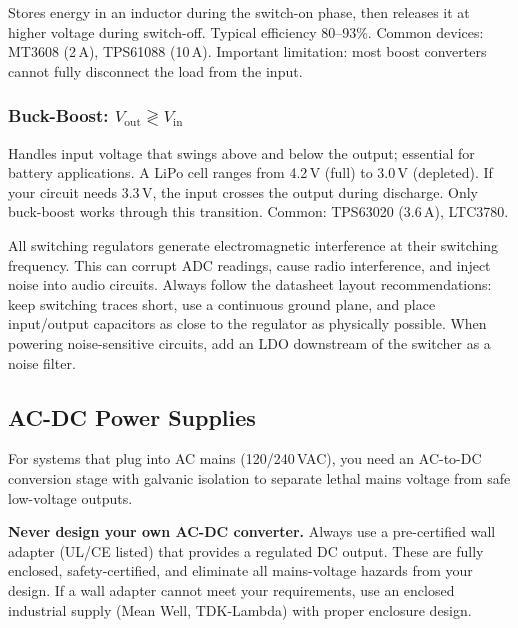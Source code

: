 Stores energy in an inductor during the switch-on phase, then releases it at higher voltage during switch-off. Typical efficiency 80--93\%. Common devices: MT3608 (2\,A), TPS61088 (10\,A). Important limitation: most boost converters cannot fully disconnect the load from the input.

\subsubsection{Buck-Boost: $V_{\text{out}} \gtrless V_{\text{in}}$}

Handles input voltage that swings above and below the output; essential for battery applications. A LiPo cell ranges from 4.2\,V (full) to 3.0\,V (depleted). If your circuit needs 3.3\,V, the input crosses the output during discharge. Only buck-boost works through this transition. Common: TPS63020 (3.6\,A), LTC3780.

\begin{warningbox}
All switching regulators generate electromagnetic interference at their switching frequency. This can corrupt ADC readings, cause radio interference, and inject noise into audio circuits. Always follow the datasheet layout recommendations: keep switching traces short, use a continuous ground plane, and place input/output capacitors as close to the regulator as physically possible. When powering noise-sensitive circuits, add an LDO downstream of the switcher as a noise filter.
\end{warningbox}

\subsection{AC-DC Power Supplies}

For systems that plug into AC mains (120/240\,VAC), you need an AC-to-DC conversion stage with galvanic isolation to separate lethal mains voltage from safe low-voltage outputs.

\begin{warningbox}
\textbf{Never design your own AC-DC converter.} Always use a pre-certified wall adapter (UL/CE listed) that provides a regulated DC output. These are fully enclosed, safety-certified, and eliminate all mains-voltage hazards from your design. If a wall adapter cannot meet your requirements, use an enclosed industrial supply (Mean Well, TDK-Lambda) with proper enclosure design.
\end{warningbox}


